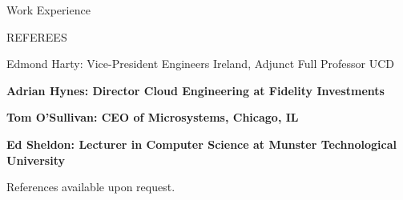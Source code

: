 \documentclass{résumé}
\begin{document}
\begin{rSection}{Work Experience}
\begin{rSection}{REFEREES}
\item Edmond Harty: \normalfont Vice-President Engineers Ireland, Adjunct Full Professor UCD
\item \bf Adrian Hynes: \normalfont Director Cloud Engineering at Fidelity Investments
\item \bf Tom O'Sullivan: \normalfont CEO of Microsystems, Chicago, IL
\item \bf Ed Sheldon: \normalfont Lecturer in Computer Science at Munster Technological University
\item \normalfont References available upon request.

\end{rSection}
\end{rSection}
\end{document}
